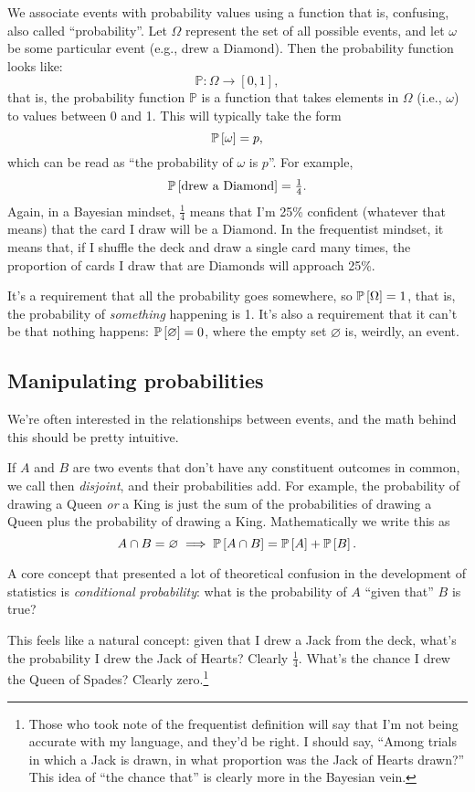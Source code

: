 We associate events with probability values using a function that is,
confusing, also called ``probability''. Let $\Omega$ represent the set of all
possible events, and let $\omega$ be some particular event (e.g., drew a
Diamond). Then the probability function looks like:
$$
\mathbb{P} : \Omega \to [0, 1],
$$
that is, the probability function $\mathbb{P}$ is a function that takes
elements in $\Omega$ (i.e., $\omega$) to values between 0 and 1. This will
typically take the form
$$
\mathbb{P}\left[{\omega}\right] = p,
$$
which can be read as ``the probability of $\omega$ is $p$''. For example,
$$
\mathbb{P}\left[{\text{drew a Diamond}}\right] = \tfrac{1}{4}.
$$
Again, in a Bayesian mindset, $\tfrac{1}{4}$ means that I'm 25\% confident
(whatever that means) that the card I draw will be a Diamond. In the
frequentist mindset, it means that, if I shuffle the deck and draw a single
card many times, the proportion of cards I draw that are Diamonds will
approach 25\%.

It's a requirement that all the probability goes somewhere, so $\mathbb{P}\left[{\Omega}\right] = 1$,
that is, the probability of \emph{something} happening is 1. It's also a
requirement that it can't be that nothing happens: $\mathbb{P}\left[{\varnothing}\right] = 0$,
where the empty set $\varnothing$ is, weirdly, an event.

\subsection{Manipulating probabilities}

We're often interested in the relationships between events, and the math
behind this should be pretty intuitive.

If $A$ and $B$ are two events that don't have any constituent outcomes in
common, we call then \emph{disjoint}, and their probabilities add. For
example, the probability of drawing a Queen \emph{or} a King is just the sum
of the probabilities of drawing a Queen plus the probability of drawing a
King. Mathematically we write this as
$$
A \cap B = \varnothing \implies \mathbb{P}\left[{A \cap B}\right] = \mathbb{P}\left[{A}\right] + \mathbb{P}\left[{B}\right].
$$


A core concept that presented a lot of theoretical confusion in the
development of statistics is \emph{conditional probability}: what is the
probability of \(A\) ``given that'' \(B\) is true?

This feels like a natural concept: given that I drew a Jack from the
deck, what's the probability I drew the Jack of Hearts? Clearly
\(\tfrac{1}{4}\). What's the chance I drew the Queen of Spades? Clearly
zero.\footnote{Those who took note of the frequentist definition will
  say that I'm not being accurate with my language, and they'd be right.
  I should say, ``Among trials in which a Jack is drawn, in what
  proportion was the Jack of Hearts drawn?'' This idea of ``the chance
  that'' is clearly more in the Bayesian vein.}

